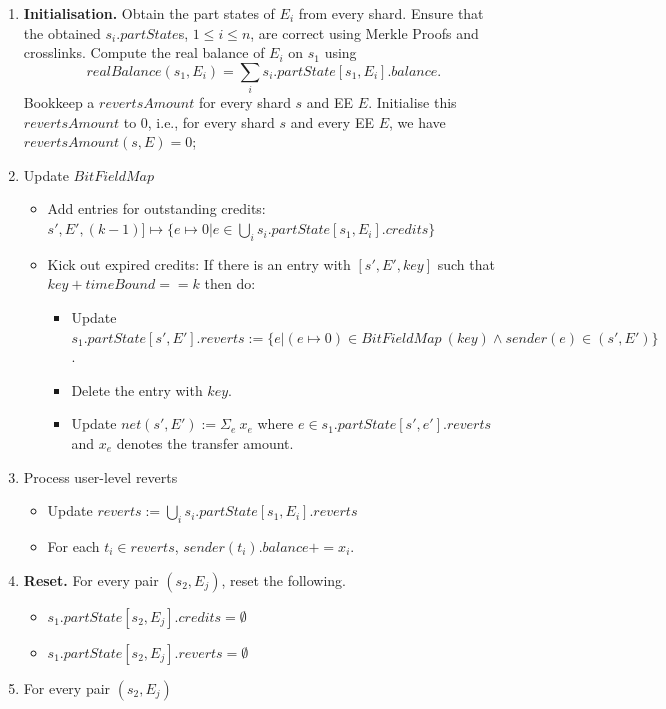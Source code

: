 \documentclass{article}
\newcommand{\bitfieldmap}[0]{\ensuremath{BitFieldMap}~}
\begin{document}
\begin{enumerate}
\item {\bf Initialisation.} Obtain the part states of $E_i$ from every shard. Ensure that the obtained $s_i.partState$s,  $1 \le i \le n$, are correct using Merkle Proofs and crosslinks.
Compute the real balance of $E_i$ on $s_1$ using 
\[
	realBalance(s_1,E_i) = \sum_i s_i.partState[s_1,E_i].balance.
\]
Bookkeep a $revertsAmount$ for every shard $s$ and EE $E$.  Initialise this $revertsAmount$ to $0$, i.e., for every shard $s$ and every EE $E$, we have $revertsAmount(s,E) = 0$;  

\item Update $\bitfieldmap$
    \begin{itemize}
        \item Add entries for outstanding credits: 
        $s', E', (k-1)] \mapsto \{e \mapsto 0 | e \in \bigcup_i s_i.partState[s_1,E_i].credits\}$
        \item Kick out expired credits: If there is an entry with $[s',E',key]$ such that $key + timeBound == k$ then do:
        \begin{itemize}
            \item Update $s_1.partState[s',E'].reverts := \{ e | (e \mapsto 0) \in \bitfieldmap(key) \wedge sender(e) \in (s',E') \}$.
            \item Delete the entry with $key$.
            \item Update $net(s',E') := \Sigma_e ~x_e$ where $e \in s_1.partState[s',e'].reverts$ and $x_e$ denotes the transfer amount.
        \end{itemize}
    \end{itemize}
\item Process user-level reverts
    \begin{itemize}
	    \item Update $reverts := \bigcup_i s_i.partState[s_1,E_i].reverts$
	    \item For each $t_i \in reverts$, $sender(t_i).balance += x_i$.
    \end{itemize}
\item {\bf Reset.} For every pair $(s_2,E_j)$, reset the following.
\begin{itemize}
	\item $s_1.partState[s_2,E_j].credits = \emptyset$
	\item $s_1.partState[s_2,E_j].reverts = \emptyset$
\end{itemize}
\item For every pair $(s_2,E_j)$

\end{enumerate}
\end{document}
